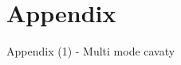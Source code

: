 \documentclass{beamer}
\begin{document}
\section{Appendix}
\begin{frame}[t,fragile]{Appendix (1) - Multi mode cavaty}
\begin{figure}
  \centering
  \quad
  \\
\end{figure}
\end{frame}
\end{document}
